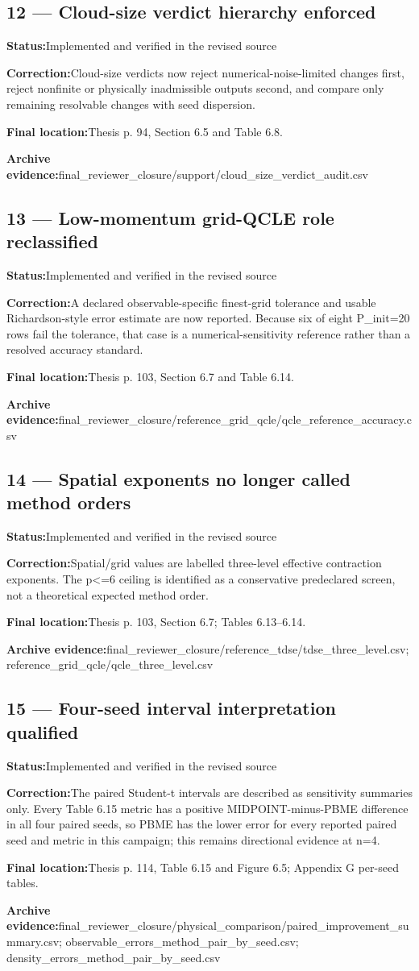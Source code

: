 \documentclass[11pt]{article}
\newcommand{\field}[2]{\textbf{#1}\quad #2\par}
\begin{document}
\subsection*{12 --- Cloud-size verdict hierarchy enforced}
\field{Status:}{Implemented and verified in the revised source}
\field{Correction:}{Cloud-size verdicts now reject numerical-noise-limited changes first, reject nonfinite or physically inadmissible outputs second, and compare only remaining resolvable changes with seed dispersion.}
\field{Final location:}{Thesis p. 94, Section 6.5 and Table 6.8.}
\field{Archive evidence:}{final\_reviewer\_closure/support/cloud\_size\_verdict\_audit.csv}
\subsection*{13 --- Low-momentum grid-QCLE role reclassified}
\field{Status:}{Implemented and verified in the revised source}
\field{Correction:}{A declared observable-specific finest-grid tolerance and usable Richardson-style error estimate are now reported. Because six of eight P\_init=20 rows fail the tolerance, that case is a numerical-sensitivity reference rather than a resolved accuracy standard.}
\field{Final location:}{Thesis p. 103, Section 6.7 and Table 6.14.}
\field{Archive evidence:}{final\_reviewer\_closure/reference\_grid\_qcle/qcle\_reference\_accuracy.csv}
\subsection*{14 --- Spatial exponents no longer called method orders}
\field{Status:}{Implemented and verified in the revised source}
\field{Correction:}{Spatial/grid values are labelled three-level effective contraction exponents. The p<=6 ceiling is identified as a conservative predeclared screen, not a theoretical expected method order.}
\field{Final location:}{Thesis p. 103, Section 6.7; Tables 6.13--6.14.}
\field{Archive evidence:}{final\_reviewer\_closure/reference\_tdse/tdse\_three\_level.csv; reference\_grid\_qcle/qcle\_three\_level.csv}
\subsection*{15 --- Four-seed interval interpretation qualified}
\field{Status:}{Implemented and verified in the revised source}
\field{Correction:}{The paired Student-t intervals are described as sensitivity summaries only. Every Table 6.15 metric has a positive MIDPOINT-minus-PBME difference in all four paired seeds, so PBME has the lower error for every reported paired seed and metric in this campaign; this remains directional evidence at n=4.}
\field{Final location:}{Thesis p. 114, Table 6.15 and Figure 6.5; Appendix G per-seed tables.}
\field{Archive evidence:}{final\_reviewer\_closure/physical\_comparison/paired\_improvement\_summary.csv; observable\_errors\_method\_pair\_by\_seed.csv; density\_errors\_method\_pair\_by\_seed.csv}
\end{document}
